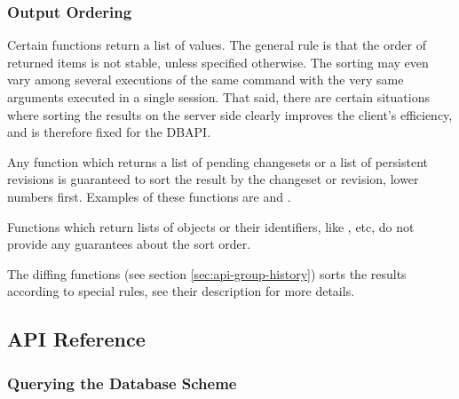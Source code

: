 \documentclass{article}
\begin{document}
\subsubsection{Output Ordering}

Certain functions return a list of values.  The general rule is that the order of returned items is not stable, unless
specified otherwise.  The sorting may even vary among several executions of the same command with the very same
arguments executed in a single session.  That said, there are certain situations where sorting the results on the server
side clearly improves the client's efficiency, and is therefore fixed for the DBAPI.

Any function which returns a list of pending changesets or a list of persistent revisions is guaranteed to sort the
result by the changeset or revision, lower numbers first.  Examples of these functions are 
and .

Functions which return lists of objects or their identifiers, like ,
 etc, do not provide any guarantees about the sort order.

The diffing functions (see section \ref{sec:api-group-history}) sorts the results according to special rules, see their
description for more details.

\subsection{API Reference}

\newcommand{\deskaFunc}[5]
{\paragraph{#1}\label{sec:api-ref-#1}

{#4}

{#5}

\subparagraph{Sample JSON input} {\tt \{"command": "{#1}"{#2}\}}

\subparagraph{Sample JSON output} {\tt \{"response": "{#1}"{#2}\ifstrequal{#3}{}{}{, "{#1}": {#3}}\}}

}

\newcommand{\deskaUnsortedRes}{The order of the returned data is not specified.}

\setcounter{secnumdepth}{4}

\subsubsection{Querying the Database Scheme}
\label{sec:api-group-dbscheme}
\end{document}
